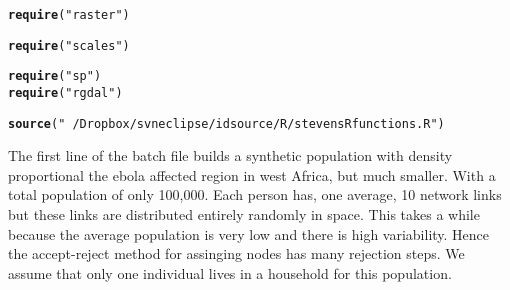 \documentclass{article}\usepackage[]{graphicx}\usepackage[]{color}
\makeatletter
\newcommand{\hlstr}[1]{\textcolor[rgb]{0.192,0.494,0.8}{#1}}%
\newcommand{\hlstd}[1]{\textcolor[rgb]{0.345,0.345,0.345}{#1}}%
\newcommand{\hlkwd}[1]{\textcolor[rgb]{0.737,0.353,0.396}{\textbf{#1}}}%
\newenvironment{kframe}{%
 \def\at@end@of@kframe{}%
 \ifinner\ifhmode%
  \def\at@end@of@kframe{\end{minipage}}%
  \begin{minipage}{\columnwidth}%
 \fi\fi%
 \def\FrameCommand##1{\hskip\@totalleftmargin \hskip-\fboxsep
 \colorbox{shadecolor}{##1}\hskip-\fboxsep
     \hskip-\linewidth \hskip-\@totalleftmargin \hskip\columnwidth}%
 \MakeFramed {\advance\hsize-\width
   \@totalleftmargin\z@ \linewidth\hsize
   \@setminipage}}%
 {\par\unskip\endMakeFramed%
 \at@end@of@kframe}
\newenvironment{knitrout}{}{} %
\makeatother
\begin{document}
\begin{knitrout}
\color{fgcolor}\begin{kframe}
\begin{alltt}
\hlkwd{require}\hlstd{(}\hlstr{"raster"}\hlstd{)}
\end{alltt}


{\ttfamily\noindent\itshape\color{messagecolor}{\#\# Loading required package: raster}}

{\ttfamily\noindent\itshape\color{messagecolor}{\#\# Loading required package: sp}}\begin{alltt}
\hlkwd{require}\hlstd{(}\hlstr{"scales"}\hlstd{)}
\end{alltt}


{\ttfamily\noindent\itshape\color{messagecolor}{\#\# Loading required package: scales}}\begin{alltt}
\hlkwd{require}\hlstd{(}\hlstr{"sp"}\hlstd{)}
\hlkwd{require}\hlstd{(}\hlstr{"rgdal"}\hlstd{)}
\end{alltt}


{\ttfamily\noindent\itshape\color{messagecolor}{\#\# Loading required package: rgdal}}

{\ttfamily\noindent\itshape\color{messagecolor}{\#\# rgdal: version: 1.2-20, (SVN revision 725)\\\#\#\ \ Geospatial Data Abstraction Library extensions to R successfully loaded\\\#\#\ \ Loaded GDAL runtime: GDAL 2.2.3, released 2017/11/20\\\#\#\ \ Path to GDAL shared files: E:/R/win-library/3.4/rgdal/gdal\\\#\#\ \ GDAL binary built with GEOS: TRUE \\\#\#\ \ Loaded PROJ.4 runtime: Rel. 4.9.3, 15 August 2016, [PJ\_VERSION: 493]\\\#\#\ \ Path to PROJ.4 shared files: E:/R/win-library/3.4/rgdal/proj\\\#\#\ \ Linking to sp version: 1.2-7}}\begin{alltt}
\hlkwd{source}\hlstd{(}\hlstr{"~/Dropbox/svneclipse/idsource/R/stevensRfunctions.R"}\hlstd{)}
\end{alltt}


{\ttfamily\noindent\bfseries{}}\end{kframe}
\end{knitrout}

The first line of the batch file builds a synthetic population with density
proportional the ebola affected region in west Africa, but much smaller. With a total population of only
100,000. Each person has, one average, 10 network links but these links are
distributed entirely randomly in space. This takes a while because the
average population is very low and there is high variability. Hence the
accept-reject method for assinging nodes has many rejection steps. We assume
that only one individual lives in a household for this population. 
\end{document}
